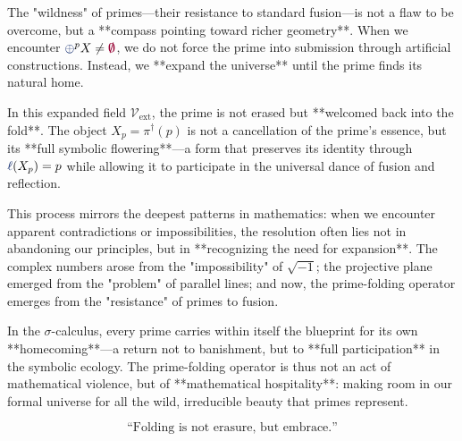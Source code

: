 The "wildness" of primes—their resistance to standard fusion—is not a flaw to be overcome, but a **compass pointing toward richer geometry**. When we encounter $\fuse^p X \neq \void$, we do not force the prime into submission through artificial constructions. Instead, we **expand the universe** until the prime finds its natural home.

In this expanded field $\mathcal{V}_{\text{ext}}$, the prime is not erased but **welcomed back into the fold**. The object $X_p = \pi^\dagger(p)$ is not a cancellation of the prime's essence, but its **full symbolic flowering**—a form that preserves its identity through $\lha(X_p) = p$ while allowing it to participate in the universal dance of fusion and reflection.

This process mirrors the deepest patterns in mathematics: when we encounter apparent contradictions or impossibilities, the resolution often lies not in abandoning our principles, but in **recognizing the need for expansion**. The complex numbers arose from the "impossibility" of $\sqrt{-1}$; the projective plane emerged from the "problem" of parallel lines; and now, the prime-folding operator emerges from the "resistance" of primes to fusion.

In the $\sigma$-calculus, every prime carries within itself the blueprint for its own **homecoming**—a return not to banishment, but to **full participation** in the symbolic ecology. The prime-folding operator is thus not an act of mathematical violence, but of **mathematical hospitality**: making room in our formal universe for all the wild, irreducible beauty that primes represent.

\[ \text{``Folding is not erasure, but embrace.''} \] 